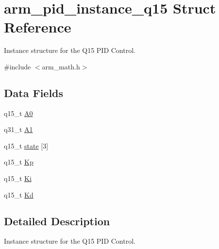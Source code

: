 \hypertarget{structarm__pid__instance__q15}{\section{arm\-\_\-pid\-\_\-instance\-\_\-q15 Struct Reference}
\label{structarm__pid__instance__q15}
}


Instance structure for the Q15 P\-I\-D Control.  




{\ttfamily \#include $<$arm\-\_\-math.\-h$>$}

\subsection*{Data Fields}
\begin{DoxyCompactItemize}
\item 
q15\-\_\-t \hyperlink{structarm__pid__instance__q15_a1aa73268c65cea0c7bc66bb70ff35205}{A0}
\item 
q31\-\_\-t \hyperlink{structarm__pid__instance__q15_aeb897c84724b56948e4222aca8d0e1f4}{A1}
\item 
q15\-\_\-t \hyperlink{structarm__pid__instance__q15_a4c4e19d77015f5f7a31a1daf0faf31b6}{state} \mbox{[}3\mbox{]}
\item 
q15\-\_\-t \hyperlink{structarm__pid__instance__q15_afef61fb3b64c73f2cd0c91d9dcf95679}{Kp}
\item 
q15\-\_\-t \hyperlink{structarm__pid__instance__q15_a19d5059baf06dd52266260d096702d0a}{Ki}
\item 
q15\-\_\-t \hyperlink{structarm__pid__instance__q15_abf38d18de1e16bc6d86846fedf8534fe}{Kd}
\end{DoxyCompactItemize}


\subsection{Detailed Description}
Instance structure for the Q15 P\-I\-D Control. 

